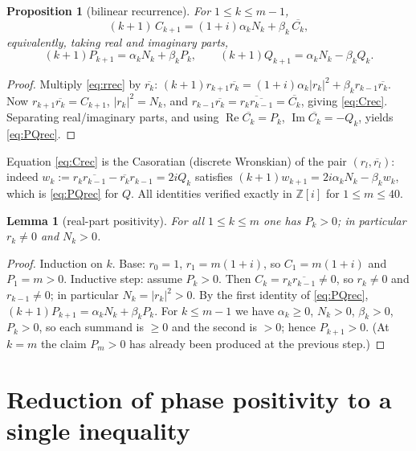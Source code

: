 \documentclass[11pt]{article}
\newtheorem{proposition}{Proposition}
\newtheorem{lemma}{Lemma}
\theoremstyle{definition}
\newcommand{\Z}{\mathbb{Z}}
\newcommand{\Zi}{\Z[i]}
\renewcommand{\Re}{\operatorname{Re}}
\renewcommand{\Im}{\operatorname{Im}}
\begin{document}
\begin{proposition}[bilinear recurrence]\label{prop:Crec}
For $1\le k\le m-1$,
\begin{equation}\label{eq:Crec}
  (k+1)\,C_{k+1}=(1+i)\alpha_k N_k+\beta_k\,\overline{C_k},
\end{equation}
equivalently, taking real and imaginary parts,
\begin{equation}\label{eq:PQrec}
  (k+1)P_{k+1}=\alpha_k N_k+\beta_k P_k,\qquad
  (k+1)Q_{k+1}=\alpha_k N_k-\beta_k Q_k .
\end{equation}
\end{proposition}
\begin{proof}
Multiply \eqref{eq:rrec} by $\overline{r_k}$:
$(k+1)r_{k+1}\overline{r_k}=(1+i)\alpha_k|r_k|^2+\beta_k r_{k-1}\overline{r_k}$.
Now $r_{k+1}\overline{r_k}=C_{k+1}$, $|r_k|^2=N_k$, and
$r_{k-1}\overline{r_k}=\overline{r_k\overline{r_{k-1}}}=\overline{C_k}$, giving
\eqref{eq:Crec}.  Separating real/imaginary parts, and using
$\Re\overline{C_k}=P_k$, $\Im\overline{C_k}=-Q_k$, yields \eqref{eq:PQrec}.
\end{proof}

Equation \eqref{eq:Crec} is the Casoratian (discrete Wronskian) of the pair
$(r_l,\overline{r_l})$: indeed $w_k:=r_k\overline{r_{k-1}}-\overline{r_k}r_{k-1}
=2iQ_k$ satisfies $(k+1)w_{k+1}=2i\alpha_kN_k-\beta_k w_k$, which is
\eqref{eq:PQrec} for $Q$.  All identities verified exactly in $\Zi$ for
$1\le m\le40$.

\begin{lemma}[real-part positivity]\label{lem:Ppos}
For all $1\le k\le m$ one has $P_k>0$; in particular $r_k\neq0$ and $N_k>0$.
\end{lemma}
\begin{proof}
Induction on $k$.  Base: $r_0=1$, $r_1=m(1+i)$, so $C_1=m(1+i)$ and $P_1=m>0$.
Inductive step: assume $P_k>0$.  Then $C_k=r_k\overline{r_{k-1}}\neq0$, so
$r_k\neq0$ and $r_{k-1}\neq0$; in particular $N_k=|r_k|^2>0$.  By the first
identity of \eqref{eq:PQrec}, $(k+1)P_{k+1}=\alpha_kN_k+\beta_kP_k$.  For
$k\le m-1$ we have $\alpha_k\ge0$, $N_k>0$, $\beta_k>0$, $P_k>0$, so each summand
is $\ge0$ and the second is $>0$; hence $P_{k+1}>0$.  (At $k=m$ the claim
$P_m>0$ has already been produced at the previous step.)
\end{proof}

\section{Reduction of phase positivity to a single inequality}
\end{document}
